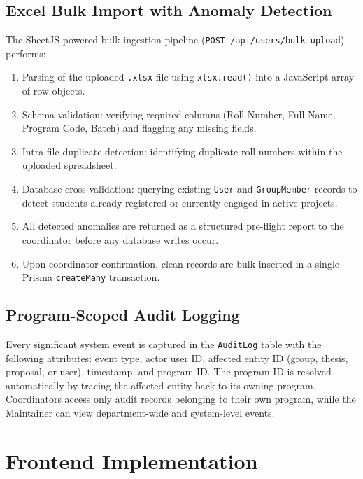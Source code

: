 \subsection{Excel Bulk Import with Anomaly Detection}
The SheetJS-powered bulk ingestion pipeline (\texttt{POST /api/users/bulk-upload}) performs:
\begin{enumerate}
    \item Parsing of the uploaded \texttt{.xlsx} file using \texttt{xlsx.read()} into a JavaScript array of row objects.
    \item Schema validation: verifying required columns (Roll Number, Full Name, Program Code, Batch) and flagging any missing fields.
    \item Intra-file duplicate detection: identifying duplicate roll numbers within the uploaded spreadsheet.
    \item Database cross-validation: querying existing \texttt{User} and \texttt{GroupMember} records to detect students already registered or currently engaged in active projects.
    \item All detected anomalies are returned as a structured pre-flight report to the coordinator before any database writes occur.
    \item Upon coordinator confirmation, clean records are bulk-inserted in a single Prisma \texttt{createMany} transaction.
\end{enumerate}

\subsection{Program-Scoped Audit Logging}
Every significant system event is captured in the \texttt{AuditLog} table with the following attributes: event type, actor user ID, affected entity ID (group, thesis, proposal, or user), timestamp, and program ID. The program ID is resolved automatically by tracing the affected entity back to its owning program. Coordinators access only audit records belonging to their own program, while the Maintainer can view department-wide and system-level events.

\section{Frontend Implementation}

